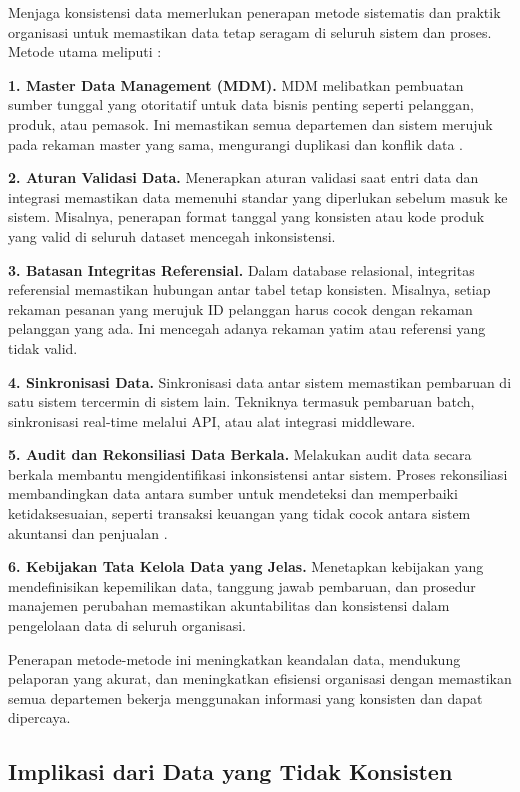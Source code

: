 Menjaga konsistensi data memerlukan penerapan metode sistematis dan praktik organisasi untuk memastikan data tetap seragam di seluruh sistem dan proses. Metode utama meliputi \cite{watson2009data}:

\textbf{1. Master Data Management (MDM).}  
MDM melibatkan pembuatan sumber tunggal yang otoritatif untuk data bisnis penting seperti pelanggan, produk, atau pemasok. Ini memastikan semua departemen dan sistem merujuk pada rekaman master yang sama, mengurangi duplikasi dan konflik data \cite{otto2011mdm}.

\textbf{2. Aturan Validasi Data.}  
Menerapkan aturan validasi saat entri data dan integrasi memastikan data memenuhi standar yang diperlukan sebelum masuk ke sistem. Misalnya, penerapan format tanggal yang konsisten atau kode produk yang valid di seluruh dataset mencegah inkonsistensi.

\textbf{3. Batasan Integritas Referensial.}  
Dalam database relasional, integritas referensial memastikan hubungan antar tabel tetap konsisten. Misalnya, setiap rekaman pesanan yang merujuk ID pelanggan harus cocok dengan rekaman pelanggan yang ada. Ini mencegah adanya rekaman yatim atau referensi yang tidak valid.

\textbf{4. Sinkronisasi Data.}  
Sinkronisasi data antar sistem memastikan pembaruan di satu sistem tercermin di sistem lain. Tekniknya termasuk pembaruan batch, sinkronisasi real-time melalui API, atau alat integrasi middleware.

\textbf{5. Audit dan Rekonsiliasi Data Berkala.}  
Melakukan audit data secara berkala membantu mengidentifikasi inkonsistensi antar sistem. Proses rekonsiliasi membandingkan data antara sumber untuk mendeteksi dan memperbaiki ketidaksesuaian, seperti transaksi keuangan yang tidak cocok antara sistem akuntansi dan penjualan \cite{laurila1999data}.

\textbf{6. Kebijakan Tata Kelola Data yang Jelas.}  
Menetapkan kebijakan yang mendefinisikan kepemilikan data, tanggung jawab pembaruan, dan prosedur manajemen perubahan memastikan akuntabilitas dan konsistensi dalam pengelolaan data di seluruh organisasi.

Penerapan metode-metode ini meningkatkan keandalan data, mendukung pelaporan yang akurat, dan meningkatkan efisiensi organisasi dengan memastikan semua departemen bekerja menggunakan informasi yang konsisten dan dapat dipercaya.

\subsection{Implikasi dari Data yang Tidak Konsisten}

